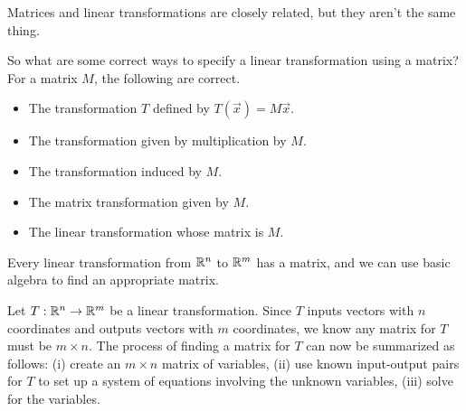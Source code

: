 \begin{emphbox}[Takeaway]
	Matrices and linear transformations are closely related, but they aren't the same thing.
\end{emphbox}

So what are some correct ways to specify a linear transformation using a matrix? 
For a matrix $M$, the following are correct.
\begin{itemize}
	\item The transformation $T$ defined by $T(\vec x)=M\vec x$.
	\item The transformation given by multiplication by $M$.
	\item The transformation induced by $M$.
	\item The matrix transformation given by $M$.
	\item The linear transformation whose matrix is $M$.
\end{itemize}


Every linear transformation from $\mathbb{R}^n$ to $\mathbb{R}^m$ has a matrix,
and we can use basic algebra to find an appropriate matrix.

Let $T:\mathbb{R}^n\to\mathbb{R}^m$ be a linear transformation. Since $T$ inputs vectors with $n$ coordinates and outputs
vectors with $m$ coordinates, we know any matrix for $T$ must be $m\times n$. The process of finding
a matrix for $T$ can now be summarized as follows: (i) create an $m\times n$ matrix of variables, (ii) use
known input-output pairs for $T$ to set up a system of equations involving the unknown variables, (iii) solve
for the variables.

